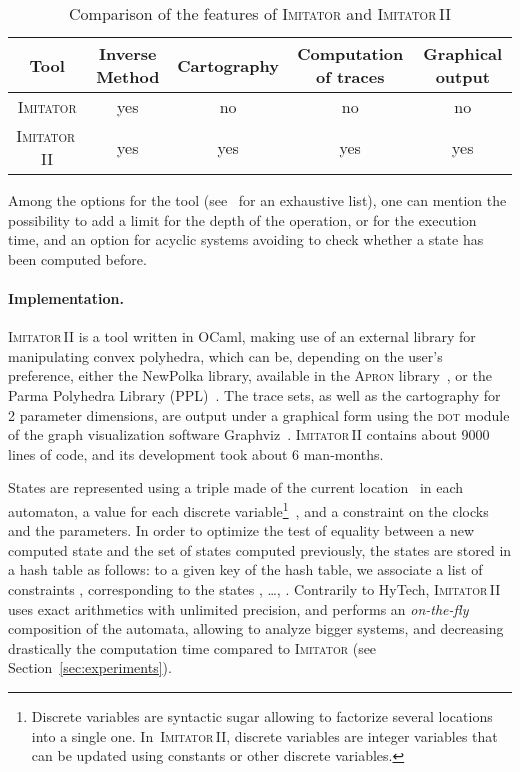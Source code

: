 \documentclass[submission,copyright,creativecommons]{eptcs}
\newcommand{\apron}{\textsc{Apron}}
\newcommand{\gdot}{\textsc{dot}}
\newcommand{\graphviz}{Graphviz}
\newcommand{\hytech}{{\sc HyTech}}
\newcommand{\imitator}{\textsc{Imitator}}
\newcommand{\imitatordeux}{\textsc{Imitator}\,II}
\newcommand{\ocaml}{OCaml}
\newcommand{\polka}{NewPolka}
\newcommand{\paragraphe}[1]{\paragraph{#1.}}
\begin{document}
\begin{table}[ht!]
{

\centering
\small

\begin{tabular}{| c || c | c | c | c |}
	\hline
	Tool & Inverse Method & Cartography & Computation of traces & Graphical output \\
	\hline
	\imitator{} & yes & no & no & no \\
	\hline
	\imitatordeux{} & yes & yes & yes & yes \\
	\hline
\end{tabular}

}
\caption{Comparison of the features of \imitator{} and \imitatordeux{}}
\label{table:features}
\end{table}


Among the options for the tool (see~\cite{imitator2_web} for an exhaustive list), one can mention the possibility to add a limit for the depth of the  operation, or for the execution time, and an option for acyclic systems avoiding to check whether a state has been computed before.




\paragraphe{Implementation}


\imitatordeux{} is a tool written in \ocaml{},
making use of an external library for manipulating convex polyhedra, which can be,
depending on the user's preference, either the \polka{} library, available in the \apron{} library~\cite{jm09}, or the Parma Polyhedra Library (PPL)~\cite{bhz08}.
The trace sets, as well as the cartography for 2 parameter dimensions, are output under a graphical form using the \gdot{} module of the graph visualization software \graphviz{}~\cite{graphviz-web}.
\imitatordeux{} contains about 9000 lines of code, and its development took about 6 man-months.




States are represented using a triple  made of the current location~ in each automaton, a value for each discrete variable\footnote{Discrete variables are syntactic sugar allowing to factorize several locations into a single one. In~\imitatordeux{}, discrete variables are integer variables that can be updated using constants or other discrete variables.}~, and a constraint  on the clocks and the parameters.
In order to optimize the test of equality between a new computed state and the set of states computed previously, the states are stored in a hash table as follows:
to a given key  of the hash table, we associate a list of constraints , corresponding to the  states , \dots, .
Contrarily to \hytech{},
\imitatordeux{} uses exact arithmetics with unlimited precision,
and performs an \emph{on-the-fly} composition of the automata,
allowing to analyze bigger systems, and decreasing drastically the computation time compared to \imitator{} (see Section~\ref{sec:experiments}).
\end{document}
